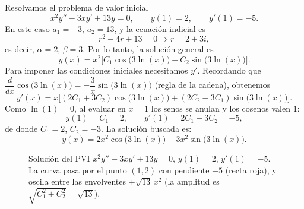 \begin{example}
    Resolvamos el problema de valor inicial
    \[
    x^2y''-3xy'+13y=0,\qquad y(1)=2,\qquad y'(1)=-5.
    \]
    En este caso $a_1=-3$, $a_2=13$, y la ecuaci\'on indicial es
    \[
    r^2-4r+13=0\Longrightarrow r=2\pm 3i,
    \]
    es decir, $\alpha=2$, $\beta=3$. Por lo tanto, la soluci\'on general es
    \[
    y(x)=x^2\Big[C_1\cos\big(3\ln(x)\big)+C_2\sin\big(3\ln(x)\big)\Big].
    \]
    Para imponer las condiciones iniciales necesitamos $y'$. Recordando que $\dfrac{d}{dx}\cos\big(3\ln(x)\big)=-\dfrac{3}{x}\sin\big(3\ln(x)\big)$ (regla de la cadena), obtenemos
    \[
    y'(x)=x\Big[(2C_1+3C_2)\cos\big(3\ln(x)\big)+(2C_2-3C_1)\sin\big(3\ln(x)\big)\Big].
    \]
    Como $\ln(1)=0$, al evaluar en $x=1$ los senos se anulan y los cosenos valen $1$:
    \[
    y(1)=C_1=2,\qquad y'(1)=2C_1+3C_2=-5,
    \]
    de donde $C_1=2$, $C_2=-3$. La soluci\'on buscada es:
    \[
    y(x)=2x^2\cos\big(3\ln(x)\big)-3x^2\sin\big(3\ln(x)\big).
    \]
\end{example}

\begin{figure}[h!]
    \centering
    \caption{Soluci\'on del PVI $x^2y''-3xy'+13y=0$, $y(1)=2$, $y'(1)=-5$. La curva pasa por el punto $(1,2)$ con pendiente $-5$ (recta roja), y oscila entre las envolventes $\pm\sqrt{13}\,x^2$ (la amplitud es $\sqrt{C_1^2+C_2^2}=\sqrt{13}$).}
    \label{fig:euler_pvi}
\end{figure}

